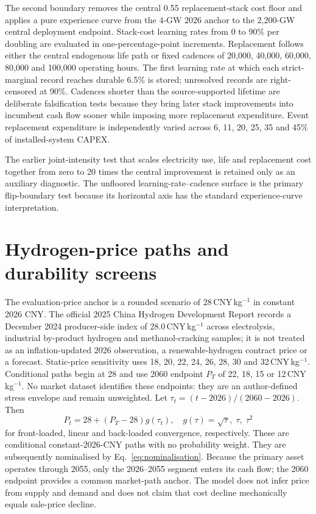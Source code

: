 \documentclass[11pt,a4paper]{article}
\begin{document}
The second boundary removes the central 0.55 replacement-stack cost floor and applies a pure experience curve from the 4-GW 2026 anchor to the 2,200-GW central deployment endpoint. Stack-cost learning rates from 0 to 90\% per doubling are evaluated in one-percentage-point increments. Replacement follows either the central endogenous life path or fixed cadences of 20,000, 40,000, 60,000, 80,000 and 100,000 operating hours. The first learning rate at which each strict-marginal record reaches durable 6.5\% is stored; unresolved records are right-censored at 90\%. Cadences shorter than the source-supported lifetime are deliberate falsification tests because they bring later stack improvements into incumbent cash flow sooner while imposing more replacement expenditure. Event replacement expenditure is independently varied across 6, 11, 20, 25, 35 and 45\% of installed-system CAPEX.

The earlier joint-intensity test that scales electricity use, life and replacement cost together from zero to 20 times the central improvement is retained only as an auxiliary diagnostic. The unfloored learning-rate--cadence surface is the primary flip-boundary test because its horizontal axis has the standard experience-curve interpretation.

\section{Hydrogen-price paths and durability screens}\label{sec:price}

The evaluation-price anchor is a rounded scenario of 28\,CNY\,kg$^{-1}$ in constant 2026 CNY. The official 2025 China Hydrogen Development Report records a December 2024 producer-side index of 28.0\,CNY\,kg$^{-1}$ across electrolysis, industrial by-product hydrogen and methanol-cracking samples; it is not treated as an inflation-updated 2026 observation, a renewable-hydrogen contract price or a forecast\cite{nea2025hydrogen}. Static-price sensitivity uses 18, 20, 22, 24, 26, 28, 30 and 32\,CNY\,kg$^{-1}$. Conditional paths begin at 28 and use 2060 endpoint $P_T$ of 22, 18, 15 or 12\,CNY\,kg$^{-1}$. No market dataset identifies these endpoints: they are an author-defined stress envelope and remain unweighted. Let $\tau_t=(t-2026)/(2060-2026)$. Then
\begin{equation}
P_t=28+(P_T-28)g(\tau_t), \quad
g(\tau)=\sqrt{\tau},\;\tau,\;\tau^2
\label{eq:pricepaths}
\end{equation}
for front-loaded, linear and back-loaded convergence, respectively. These are conditional constant-2026-CNY paths with no probability weight. They are subsequently nominalised by Eq.~\ref{eq:nominalisation}. Because the primary asset operates through 2055, only the 2026--2055 segment enters its cash flow; the 2060 endpoint provides a common market-path anchor. The model does not infer price from supply and demand and does not claim that cost decline mechanically equals sale-price decline.
\end{document}
